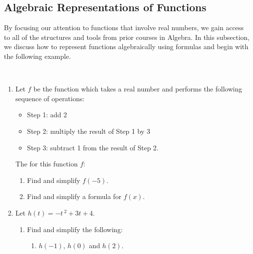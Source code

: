\documentclass{ximera}
\begin{document}
\subsection{Algebraic Representations of Functions}  

By focusing our attention to functions that involve real numbers, we gain access to all of the structures and tools from prior courses in Algebra.  In this subsection, we discuss how to represent functions algebraically using formulas and begin with the following example.



\begin{example} \label{funcnotatex1} $~$

\begin{enumerate}

\item  Let $f$ be the function which takes a real number and performs the following sequence of operations:

\begin{itemize}

\item Step 1:  add 2

\item Step 2:  multiply the result of Step 1 by 3

\item Step 3:  subtract 1 from the result of Step 2.

\end{itemize}

The for this function $f$:
\begin{enumerate}

\item  Find and simplify $f(-5)$.

\item  Find and simplify a formula for $f(x)$.

\end{enumerate}

 

\item Let $h(t) = -t\,^{2} + 3t + 4$.

\begin{enumerate}

\item  Find and simplify the following:

\begin{enumerate}

\item $h(-1)$, $h(0)$ and $h(2)$.


\end{enumerate}
\end{enumerate}
\end{enumerate}
\end{example}
\end{document}
